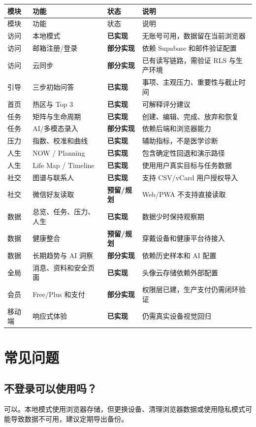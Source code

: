 \documentclass[11pt,a4paper,openany]{ctexrep}
\newcommand{\statusdone}{\textcolor{VDGreen}{\textbf{已实现}}}
\newcommand{\statuspartial}{\textcolor{VDOrange}{\textbf{部分实现}}}
\newcommand{\statusplanned}{\textcolor{VDGray}{\textbf{预留/规划}}}
\begin{document}
\begin{longtable}{p{3.0cm}p{3.1cm}p{2.0cm}p{6.1cm}}
\toprule
模块 & 功能 & 状态 & 说明 \\
\midrule
\endfirsthead
\toprule
模块 & 功能 & 状态 & 说明 \\
\midrule
\endhead
访问 & 本地模式 & \statusdone & 无账号可用，数据留在当前浏览器 \\
访问 & 邮箱注册/登录 & \statuspartial & 依赖 Supabase 和邮件验证配置 \\
访问 & 云同步 & \statuspartial & 已有读写链路，需验证 RLS 与生产环境 \\
引导 & 三步初始问答 & \statusdone & 事项、主观压力、重要性与截止时间 \\
首页 & 热区与 Top 3 & \statusdone & 可解释评分建议 \\
任务 & 矩阵与生命周期 & \statusdone & 创建、编辑、完成、放弃和恢复 \\
任务 & AI/多模态录入 & \statuspartial & 依赖后端和浏览器能力 \\
压力 & 指数、校准和曲线 & \statusdone & 辅助指标，不是医学诊断 \\
人生 & NOW / Planning & \statusdone & 包含确定性回退和演示路径 \\
人生 & Life Map / Timeline & \statusdone & 使用用户真实目标与任务数据 \\
社交 & 图谱与联系人 & \statusdone & 支持 CSV/vCard 用户授权导入 \\
社交 & 微信好友读取 & \statusplanned & Web/PWA 不支持直接读取 \\
数据 & 总览、任务、压力、人生 & \statusdone & 数据少时保持观察期 \\
数据 & 健康整合 & \statusplanned & 穿戴设备和健康平台待接入 \\
数据 & 长期趋势与 AI 洞察 & \statuspartial & 依赖历史样本和 AI 配置 \\
全局 & 消息、资料和安全页面 & \statusdone & 头像云存储依赖外部配置 \\
会员 & Free/Plus 和支付 & \statuspartial & 权限层已建，生产支付仍需闭环验证 \\
移动端 & 响应式体验 & \statusdone & 仍需真实设备视觉回归 \\
\bottomrule
\end{longtable}

\chapter{常见问题}

\section{不登录可以使用吗？}
可以。本地模式使用浏览器存储，但更换设备、清理浏览器数据或使用隐私模式可能导致数据不可用，建议定期导出备份。
\end{document}
